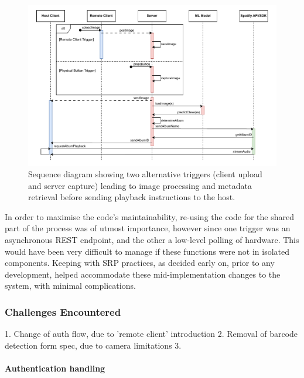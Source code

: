             \begin{figure}[h]
                \centering
                \includegraphics[width=\textwidth]{images/VTT_imageScan.SequenceDiagram.pdf}
                \caption{Sequence diagram showing two alternative triggers (client upload and server capture) leading to image processing and metadata retrieval before sending playback instructions to the host.}
                \label{fig:imageSequenceDiagram}
            \end{figure}
    
            In order to maximise the code's maintainability, re-using the code for the shared part of the process was of utmost importance, however since one trigger was an asynchronous REST endpoint, and the other a low-level polling of hardware. This would have been very difficult to manage if these functions were not in isolated components. Keeping with SRP practices, as decided early on, prior to any development, helped accommodate these mid-implementation changes to the system, with minimal complications.
    
            \subsubsection{Challenges Encountered}
                \begin{temp}
                    1. Change of auth flow, due to 'remote client' introduction
                    2. Removal of barcode detection form spec, due to camera limitations
                    3. \cite{spotify2025security}
                \end{temp}
    
                \paragraph{Authentication handling}
    
